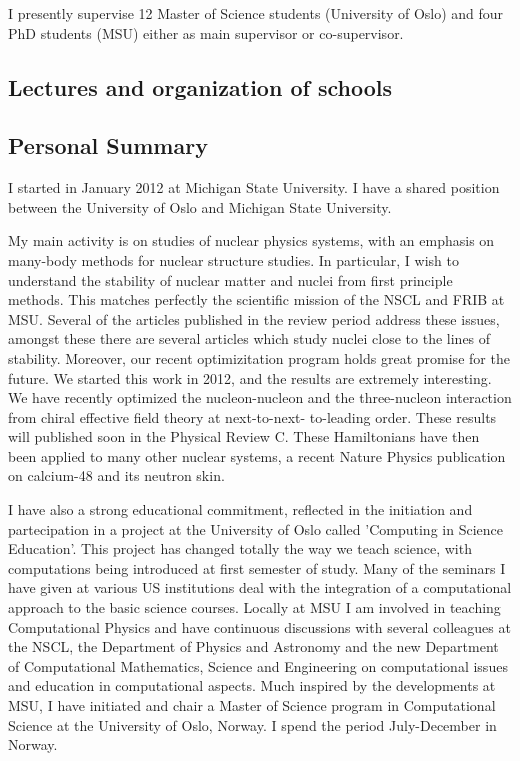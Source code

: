 \documentclass[prc,amsart,english,twocolumn,superscriptaddress,showpacs,floatfix]{revtex4}
\begin{document}
I presently supervise 12 Master of Science students (University of Oslo) and four PhD students (MSU) either as main supervisor or co-supervisor. 

\subsection*{Lectures and organization of schools}
\begin{enumerate}

\end{enumerate}



\subsection*{Personal Summary}

I started in January 2012 at Michigan State University. I have a
shared position between the University of Oslo and Michigan State
University.

My main activity is on studies of nuclear physics systems, with an
emphasis on many-body methods for nuclear structure studies. In
particular, I wish to understand the stability of nuclear matter and
nuclei from first principle methods. This matches perfectly the
scientific mission of the NSCL and FRIB at MSU.  Several of the
articles published in the review period address these issues, amongst
these there are several articles which study
nuclei close to the lines of stability.  Moreover, our recent
optimizitation program holds great promise for the future.  We 
started this work in 2012, and the results are extremely interesting.  We
have recently optimized the nucleon-nucleon and the three-nucleon interaction from chiral
effective field theory at next-to-next- to-leading order. These results will published soon in the Physical Review C. These Hamiltonians have then been applied to many other 
nuclear systems, a recent Nature Physics publication on calcium-48 and its neutron skin.

I have also a strong educational commitment, reflected in the initiation and partecipation in a project at the University of Oslo called 'Computing in Science Education'. This project has changed totally the way we teach science, with computations being introduced at first semester of study. Many of the seminars I have given at various US institutions deal with the integration of a computational approach to the basic science courses. Locally at MSU I am involved in teaching Computational Physics and have continuous discussions with several colleagues at the NSCL, the Department of Physics and Astronomy and the new Department of Computational Mathematics, Science and Engineering on computational issues and education in computational aspects. Much inspired by the developments at MSU, I have initiated and chair a Master of Science program in Computational Science at the University of Oslo, Norway. I spend the period July-December in Norway. 
\end{document}
